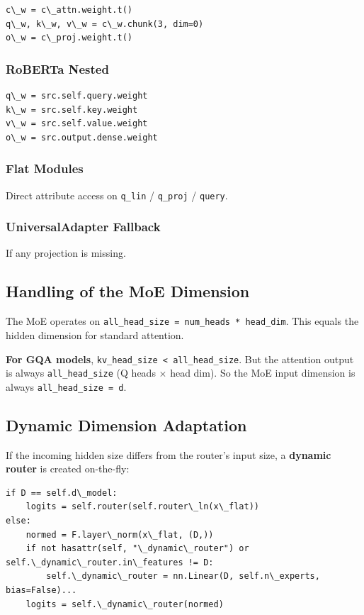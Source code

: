 \begin{lstlisting}
c\_w = c\_attn.weight.t()
q\_w, k\_w, v\_w = c\_w.chunk(3, dim=0)
o\_w = c\_proj.weight.t()
\end{lstlisting}

\subsubsection{RoBERTa Nested}

\begin{lstlisting}
q\_w = src.self.query.weight
k\_w = src.self.key.weight
v\_w = src.self.value.weight
o\_w = src.output.dense.weight
\end{lstlisting}

\subsubsection{Flat Modules}

Direct attribute access on \texttt{q\_lin} / \texttt{q\_proj} / \texttt{query}.

\subsubsection{UniversalAdapter Fallback}

If any projection is missing.

\subsection{Handling of the MoE Dimension}

The MoE operates on \texttt{all\_head\_size = num\_heads * head\_dim}. This equals the 
hidden dimension for standard attention.

\textbf{For GQA models}, \texttt{kv\_head\_size \textless{} all\_head\_size}. But the attention output 
is always \texttt{all\_head\_size} (Q heads $\times$ head dim). So the MoE input dimension 
is always \texttt{all\_head\_size = d}.

\subsection{Dynamic Dimension Adaptation}

If the incoming hidden size differs from the router's input size, a 
\textbf{dynamic router} is created on-the-fly:

\begin{lstlisting}
if D == self.d\_model:
    logits = self.router(self.router\_ln(x\_flat))
else:
    normed = F.layer\_norm(x\_flat, (D,))
    if not hasattr(self, "\_dynamic\_router") or self.\_dynamic\_router.in\_features != D:
        self.\_dynamic\_router = nn.Linear(D, self.n\_experts, bias=False)...
    logits = self.\_dynamic\_router(normed)
\end{lstlisting}


